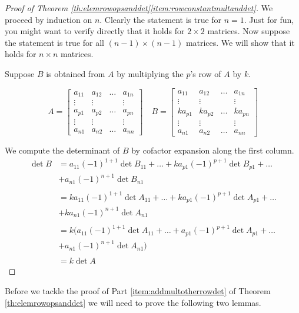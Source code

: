\documentclass{ximera}
\begin{document}
\begin{proof}[Proof of Theorem \ref{th:elemrowopsanddet}\ref{item:rowconstantmultanddet}]
We proceed by induction on $n$.  Clearly the statement is true for $n=1$.  Just for fun, you might want to verify directly that it holds for $2\times 2$ matrices.  Now suppose the statement is true for all $(n-1)\times (n-1)$ matrices. We will show that it holds for $n\times n$ matrices.

Suppose $B$ is obtained from $A$ by multiplying the $p$'s row of $A$ by $k$.  

$$A=\begin{bmatrix} a_{11} & a_{12} & \dots  & a_{1n}  \\
   \vdots & \vdots &  & \vdots \\
   a_{p1} & a_{p2} &\dots  & a_{pn}  \\
   \vdots & \vdots &  & \vdots  \\
   a_{n1} & a_{n2} & \dots  & a_{nn}\end{bmatrix}\quad
   B=\begin{bmatrix} a_{11} & a_{12} & \dots  & a_{1n}  \\
   \vdots & \vdots &  & \vdots \\
   ka_{p1} & ka_{p2} &\dots  & ka_{pn}  \\
   \vdots & \vdots &  & \vdots  \\
   a_{n1} & a_{n2} & \dots  & a_{nn}\end{bmatrix}$$
   
   We compute the determinant of $B$ by cofactor expansion along the first column.
   \begin{align*}
   \det B &=a_{11}(-1)^{1+1}\det B_{11}+\ldots +ka_{p1}(-1)^{p+1}\det B_{p1}+\ldots \\
   &+ a_{n1}(-1)^{n+1}\det B_{n1}\\
   \\
   &=ka_{11}(-1)^{1+1}\det A_{11}+\ldots +ka_{p1}(-1)^{p+1}\det A_{p1}+\ldots \\
   &+ ka_{n1}(-1)^{n+1}\det A_{n1}\\
   \\
   &=k\Big(a_{11}(-1)^{1+1}\det A_{11}+\ldots +a_{p1}(-1)^{p+1}\det A_{p1}+\ldots \\
   &+ a_{n1}(-1)^{n+1}\det A_{n1}\Big)\\
   \\
   &=k\det A
   \end{align*}
\end{proof}

Before we tackle the proof of Part \ref{item:addmultotherrowdet} of Theorem \ref{th:elemrowopsanddet} we will need to prove the following two lemmas.
\end{document}
